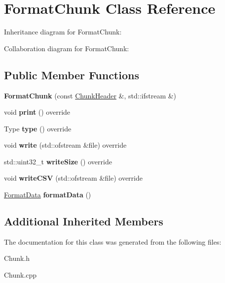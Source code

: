 \hypertarget{classFormatChunk}{}\section{Format\+Chunk Class Reference}
\label{classFormatChunk}


Inheritance diagram for Format\+Chunk\+:


Collaboration diagram for Format\+Chunk\+:
\subsection*{Public Member Functions}
\begin{DoxyCompactItemize}
\item 
\mbox{\label{classFormatChunk_a0c2ee88a0f2811a14af047768e003bb4}} 
{\bfseries Format\+Chunk} (const \hyperlink{structChunkHeader}{Chunk\+Header} \&, std\+::ifstream \&)
\item 
\mbox{\label{classFormatChunk_a241c6789688ca3d1649a588260bd9778}} 
void {\bfseries print} () override
\item 
\mbox{\label{classFormatChunk_a20ab9c81babbbb2784b8bc03a60e793a}} 
Type {\bfseries type} () override
\item 
\mbox{\label{classFormatChunk_a7cbdea236a0820cd5a7ef48360554ecb}} 
void {\bfseries write} (std\+::ofstream \&file) override
\item 
\mbox{\label{classFormatChunk_a72704c7df5f16928376dde779fdc751f}} 
std\+::uint32\+\_\+t {\bfseries write\+Size} () override
\item 
\mbox{\label{classFormatChunk_a1972d4b8e773c571223eaca8096b3305}} 
void {\bfseries write\+C\+SV} (std\+::ofstream \&file) override
\item 
\mbox{\label{classFormatChunk_a590f90c8689ed00bfb73bbda00a0f633}} 
\hyperlink{structFormatData}{Format\+Data} {\bfseries format\+Data} ()
\end{DoxyCompactItemize}
\subsection*{Additional Inherited Members}


The documentation for this class was generated from the following files\+:\begin{DoxyCompactItemize}
\item 
Chunk.\+h\item 
Chunk.\+cpp\end{DoxyCompactItemize}
